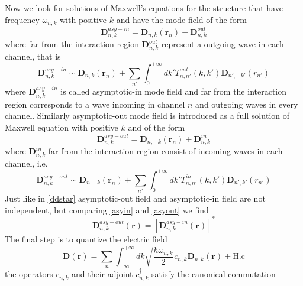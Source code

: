 \documentclass[12pt]{book}
\renewcommand{\r}{\mathbf{r}}
\begin{document}
Now we look for solutions of Maxwell's equations for the structure that have frequency $\omega_{n,k}$ with positive $k$ and have the mode field of the form
\begin{equation}\mathbf{D}^{asy-in}_{n,k} =\mathbf{D}_{n,k}(\r_n) + \mathbf{D}^{out}_{n,k}\end{equation}
where far from the interaction region $\mathbf{D}^{out}_{n,k}$ represent a outgoing wave in each channel, that is
\begin{equation}\label{asyin}\mathbf{D}^{asy-in}_{n,k} \sim \mathbf{D}_{n,k}(\r_n) + \sum_{n'}\int_{0}^{+\infty}dk' T^{out}_{n,n'}(k,k')\mathbf{D}_{n',-k'}(r_{n'})\end{equation}
where $\mathbf{D}^{asy-in}_{n,k}$ is called asymptotic-in mode field and far from the interaction region corresponds to a wave incoming in channel $n$ and outgoing waves in every channel. %
Similarly asymptotic-out mode field is introduced as a full solution of Maxwell equation with positive $k$ and of the form
\begin{equation}\mathbf{D}^{asy-out}_{n,k} =\mathbf{D}_{n,-k}(\r_n) + \mathbf{D}^{in}_{n,k}\end{equation}
where $\mathbf{D}^{in}_{n,k}$ far from the interaction region consist of incoming waves in each channel, i.e.
\begin{equation}\label{asyout}\mathbf{D}^{asy-out}_{n,k} \sim \mathbf{D}_{n,-k}(\r_n) + \sum_{n'}\int_{0}^{+\infty}dk' T^{in}_{n,n'}(k,k')\mathbf{D}_{n',k'}(r_{n'})\end{equation} 
Just like in \eqref{ddstar} asymptotic-out field and asymptotic-in field are not independent, but comparing \eqref{asyin} and \eqref{asyout} we find
\begin{equation}\mathbf{D}^{asy-out}_{n,k}(\r) = [\mathbf{D}^{asy-in}_{n,k}(\r)]^*\end{equation}
The final step is to quantize the electric field 
\begin{equation}\mathbf{D}(\r) = \sum_n \int_{-\infty}^{+\infty}dk \sqrt{\frac{\hbar \omega_{n,k}}{2}}c_{n,k}\mathbf{D}_{n,k}(\r) + \text{H.c}\end{equation}
the operators $c_{n,k}$ and their adjoint $c_{n,k}^\dagger$ satisfy the canonical commutation
\end{document}
